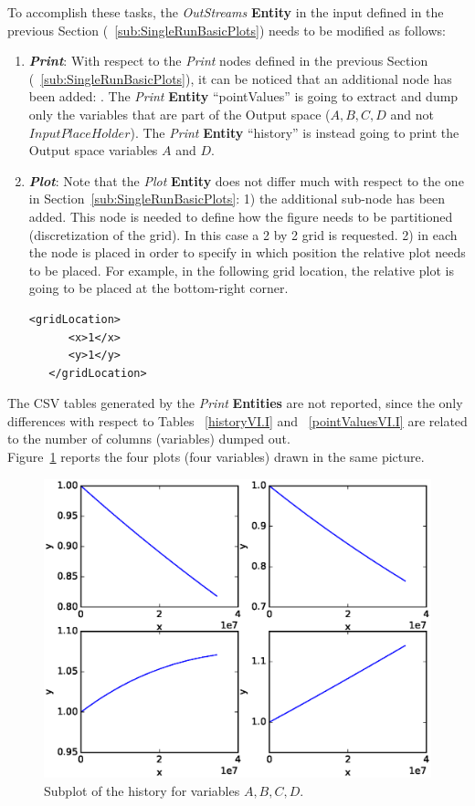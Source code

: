 To accomplish these tasks, the \textit{OutStreams} \textbf{Entity} in the input defined in the previous Section (~\ref{sub:SingleRunBasicPlots}) needs to be modified as follows:
\begin{enumerate}
   \item \textbf{\textit{Print}}:
   With respect to the \textit{Print} nodes defined in the previous Section (~\ref{sub:SingleRunBasicPlots}), it can
   be noticed that an additional node has been added: . The \textit{Print} \textbf{Entity}
   ``pointValues'' is going to extract and dump only the variables that are part of the Output space
   ($A,B,C,D$ and not $InputPlaceHolder$).  The \textit{Print} \textbf{Entity} ``history'' is instead going to print
   the Output space variables $A$ and $D$.

   \item \textbf{\textit{Plot}}:
 Note that the  \textit{Plot} \textbf{Entity} does not differ much with respect to the one in
 Section~\ref{sub:SingleRunBasicPlots}: 1) the additional sub-node   has been added.
 This node is needed to define how the figure needs to be partitioned (discretization of the grid). In this case
 a 2 by 2 grid is requested. 2) in each  the node  is placed in
 order to specify in which position the relative plot needs to be placed. For example, in the following grid
 location, the relative plot is going to be placed at the bottom-right corner.
  \begin{lstlisting}[style=XML,morekeywords={arg,extension,pauseAtEnd,overwrite}]
   <gridLocation>
      <x>1</x>
      <y>1</y>
   </gridLocation>
   \end{lstlisting}
 \end{enumerate}
The CSV tables generated by the \textit{Print} \textbf{Entities} are not reported, since the only differences with respect to Tables ~\ref{historyVI.I} and ~\ref{pointValuesVI.I} are related to the number of columns (variables)
dumped out.
\\Figure~\ref{fig:historySubPlotLine} reports the four plots (four variables) drawn in the same picture.
 \begin{figure}[h!]
  \centering
  \includegraphics[scale=0.7]{../../tests/framework/user_guide/SingleRuns/gold/sectionVI.II/1-historyPlot_line-line-line-line.eps}
  \caption{Subplot of the history for variables $A,B,C,D$.}
  \label{fig:historySubPlotLine}
 \end{figure}

